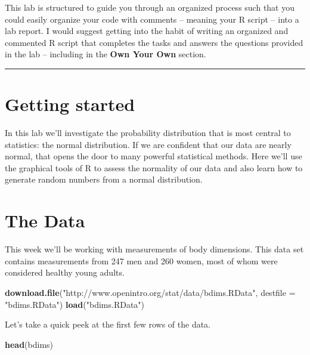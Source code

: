 \documentclass[]{book}
\newenvironment{Shaded}{\begin{snugshade}}{\end{snugshade}}
\newcommand{\KeywordTok}[1]{\textcolor[rgb]{0.13,0.29,0.53}{\textbf{{#1}}}}
\newcommand{\DataTypeTok}[1]{\textcolor[rgb]{0.13,0.29,0.53}{{#1}}}
\newcommand{\StringTok}[1]{\textcolor[rgb]{0.31,0.60,0.02}{{#1}}}
\newcommand{\NormalTok}[1]{{#1}}
\theoremstyle{definition}
\theoremstyle{definition}
\theoremstyle{definition}
\theoremstyle{remark}
\begin{document}
This lab is structured to guide you through an organized process such
that you could easily organize your code with comments -- meaning your R
script -- into a lab report. I would suggest getting into the habit of
writing an organized and commented R script that completes the tasks and
answers the questions provided in the lab -- including in the
\textbf{Own Your Own} section.

\begin{center}\rule{0.5\linewidth}{\linethickness}\end{center}

\section{Getting started}\label{getting-started-1}

In this lab we'll investigate the probability distribution that is most
central to statistics: the normal distribution. If we are confident that
our data are nearly normal, that opens the door to many powerful
statistical methods. Here we'll use the graphical tools of R to assess
the normality of our data and also learn how to generate random numbers
from a normal distribution.

\section{The Data}\label{the-data}

This week we'll be working with measurements of body dimensions. This
data set contains measurements from 247 men and 260 women, most of whom
were considered healthy young adults.

\begin{Shaded}
\begin{Highlighting}[]
\KeywordTok{download.file}\NormalTok{(}\StringTok{"http://www.openintro.org/stat/data/bdims.RData"}\NormalTok{, }\DataTypeTok{destfile =} \StringTok{"bdims.RData"}\NormalTok{)}
\KeywordTok{load}\NormalTok{(}\StringTok{"bdims.RData"}\NormalTok{)}
\end{Highlighting}
\end{Shaded}

Let's take a quick peek at the first few rows of the data.

\begin{Shaded}
\begin{Highlighting}[]
\KeywordTok{head}\NormalTok{(bdims)}
\end{Highlighting}
\end{Shaded}
\end{document}
